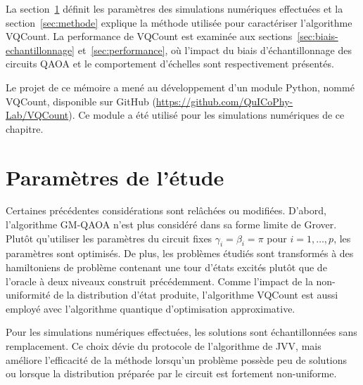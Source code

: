 La section~\ref{sec:parametres-de-etude} définit les paramètres des simulations numériques effectuées et la section~\ref{sec:methode} explique la méthode utilisée pour caractériser l'algorithme VQCount. La performance de VQCount est examinée aux sections~\ref{sec:biais-echantillonnage} et~\ref{sec:performance}, où l'impact du biais d'échantillonnage des circuits QAOA et le comportement d'échelles sont respectivement présentés.

Le projet de ce mémoire a mené au développement d'un module Python, nommé VQCount, disponible sur GitHub (\url{https://github.com/QuICoPhy-Lab/VQCount}). Ce module a été utilisé pour les simulations numériques de ce chapitre. 



\section{Paramètres de l'étude}
\label{sec:parametres-de-etude}


Certaines précédentes considérations sont relâchées ou modifiées. D'abord, 
l'algorithme GM-QAOA n'est plus considéré dans sa forme limite de Grover. Plutôt qu'utiliser les paramètres du circuit fixes $\gamma_{i}=\beta_{i}=\pi$ pour $i=1,\dots,p$, les paramètres sont optimisés. De plus, les problèmes étudiés sont transformés à des hamiltoniens de problème contenant une tour d'états excités plutôt que de l'oracle à deux niveaux construit précédemment. Comme l'impact de la non-uniformité de la distribution d'état produite, l'algorithme VQCount est aussi employé avec l'algorithme quantique d'optimisation approximative.

Pour les simulations numériques effectuées, les solutions sont échantillonnées sans remplacement. Ce choix dévie du protocole de l'algorithme de JVV, mais améliore l'efficacité de la méthode lorsqu'un problème possède peu de solutions ou lorsque la distribution préparée par le circuit est fortement non-uniforme.

